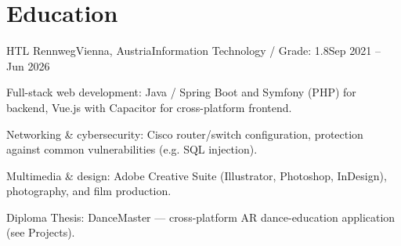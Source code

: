 \section*{Education}

\begin{eduentry}{HTL Rennweg}{Vienna, Austria}{Information Technology / Grade: 1.8}{Sep 2021 -- Jun 2026}
  \item Full-stack web development: Java / Spring Boot and Symfony (PHP) for backend, Vue.js with Capacitor for cross-platform frontend.
  \item Networking \& cybersecurity: Cisco router/switch configuration, protection against common vulnerabilities (e.g. SQL injection).
  \item Multimedia \& design: Adobe Creative Suite (Illustrator, Photoshop, InDesign), photography, and film production.
  \item Diploma Thesis: DanceMaster --- cross-platform AR dance-education application (see Projects).
\end{eduentry}
